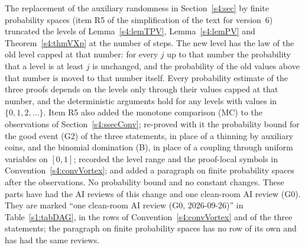 \begin{remark}
\begin{enumerate}
The replacement of the auxiliary randomness in Section~\ref{s4:sec} by finite
probability spaces (item R5 of the simplification of the text for version~6)
truncated the levels of Lemma~\ref{s4:lemTPV}, Lemma~\ref{s4:lemPV} and
Theorem~\ref{s4:thmVXp} at the number of steps. The new level has the law of
the old level capped at that number: for every $j$ up to that number the
probability that a level is at least $j$ is unchanged, and the probability of
the old values above that number is moved to that number itself. Every
probability estimate of the three proofs depends on the levels only through
their values capped at that number, and the deterministic arguments hold for
any levels with values in $\{0,1,2,\dots\}$. Item R5 also added the monotone comparison (MC) to
the observations of Section~\ref{s4:ssecConv}; re-proved with it the
probability bound for the good event (G2) of the three statements, in place of
a thinning by auxiliary coins, and the binomial domination (B), in place of a
coupling through uniform variables on $[0,1]$; recorded the level range and
the proof-local symbols in Convention~\ref{s4:convVortex}; and added a
paragraph on finite probability spaces after the observations. No probability
bound and no constant changes. These parts have had the AI reviews of this
change and one clean-room AI review (G0). They are
marked ``one clean-room AI review (G0, 2026-09-26)'' in Table~\ref{s1:tabDAG},
in the rows of
Convention~\ref{s4:convVortex} and of the three statements; the paragraph on
finite probability spaces has no row of its own and has had the same reviews.


\end{enumerate}
\end{remark}
